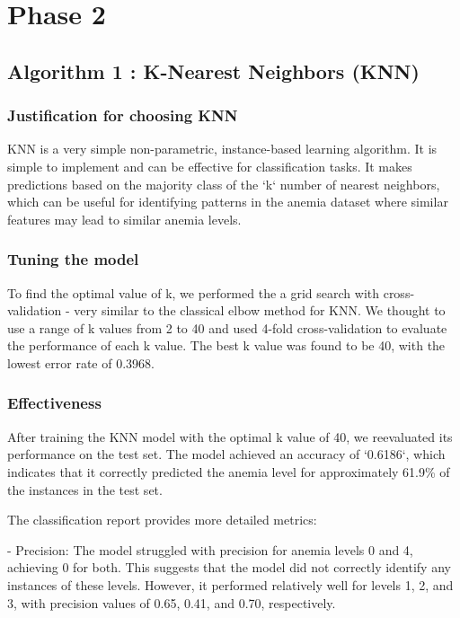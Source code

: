 \chapter{Phase 2}


\section{Algorithm 1 : K-Nearest Neighbors (KNN)}


\subsection{Justification for choosing KNN}

KNN is a very simple non-parametric, instance-based learning algorithm. It is simple to implement and can be effective for classification tasks. It makes predictions based on the majority class of the `k` number of nearest neighbors, which can be useful for identifying patterns in the anemia dataset where similar features may lead to similar anemia levels.

\subsection{Tuning the model}
To find the optimal value of k, we performed the a grid search with cross-validation - very similar to the classical elbow method for KNN. We thought to use a range of k values from 2 to 40 and used 4-fold cross-validation to evaluate the performance of each k value. The best k value was found to be 40, with the lowest error rate of 0.3968.

\subsection{Effectiveness}
After training the KNN model with the optimal k value of 40, we reevaluated its performance on the test set. The model achieved an accuracy of `0.6186`, which indicates that it correctly predicted the anemia level for approximately 61.9\% of the instances in the test set.


The classification report provides more detailed metrics:


- Precision: The model struggled with precision for anemia levels 0 and 4, achieving 0 for both. This suggests that the model did not correctly identify any instances of these levels. However, it performed relatively well for levels 1, 2, and 3, with precision values of 0.65, 0.41, and 0.70, respectively.


